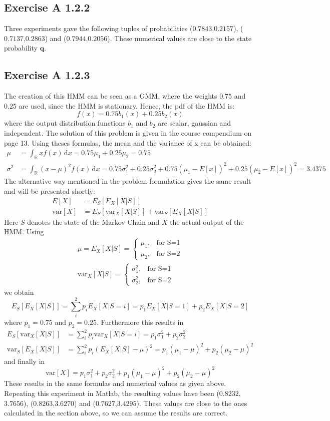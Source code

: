 \documentclass[10pt,a4paper,final]{article}
\begin{document}
\subsection{Exercise A 1.2.2}
Three experiments gave the following tuples of probabilities ($0.7843$,$0.2157$), ($0.7137$,$0.2863$) and ($0.7944$,$0.2056$). These numerical values are close to the state probability $\mathbf{q}$.
\subsection{Exercise A 1.2.3}
The creation of this HMM can be seen as a GMM, where the weights $0.75$ and $0.25$ are used, since the HMM is stationary. Hence, the pdf of the HMM is:
$$
f(x) = 0.75b_1(x) + 0.25b_2(x)$$
where the output distribution functions $b_1$ and $b_2$ are scalar, gaussian and independent. The solution of this problem is given in the course compendium on page 13. Using theses formulas, the mean and the variance of x can be obtained:
\begin{align*}
\mu  &= \int_{\mathbb{R}} \! xf(x) \, \mathrm{d}x= 0.75\mu_1 + 0.25\mu_2 = 0.75\\
\sigma^2  &=\int_{\mathbb{R}} \! (x-\mu)^2f(x) \, \mathrm{d}x=0.75\sigma_1^2+0.25\sigma_2^2+0.75(\mu_1-E[x])^2+0.25(\mu_2-E[x])^2 = 3.4375
\end{align*}
The alternative way mentioned in the problem formulation gives the same result and will be presented shortly:
\begin{align*}
E[X] &= E_S[E_X[X|S]]\\
\text{var}[X] &=E_S[\text{var}_X[X|S]]+\text{var}_S[E_X[X|S]]
\end{align*}
Here $S$ denotes the state of the Markov Chain and $X$ the actual output of the HMM. Using
\begin{align*}
\mu = E_X[X|S]= 
\begin{cases}
\mu_1, &\text{for S=1}\\
\mu_2, &\text{for S=2}
\end{cases}\\
\text{var}_X[X|S]=
\begin{cases}
\sigma_1^2, &\text{for S=1}\\
\sigma_2^2, &\text{for S=2}
\end{cases}
\end{align*}
we obtain
$$
E_S[E_X[X|S]] = \sum_i^2 p_i E_X[X|S=i] = p_1E_X[X|S=1]+p_2E_X[X|S=2]
$$
where $p_1 = 0.75$ and $p_2=0.25$. Furthermore this results in
\begin{align*}
E_S[\text{var}_X[X|S]] &= \sum_i^2 p_i \text{var}_X[X|S=i] = p_1\sigma_1^2+p_2\sigma_2^2\\
\text{var}_S[E_X[X|S]] &= \sum_i^2 p_i(E_X[X|S]-\mu)^2= p_1(\mu_1-\mu)^2+p_2(\mu_2-\mu)^2
\end{align*}
and finally in
$$
\text{var}[X] = p_1\sigma_1^2+p_2\sigma_2^2+p_1(\mu_1-\mu)^2+p_2(\mu_2-\mu)^2
$$
These results in the same formulas and numerical values as given above.\\
Repeating this experiment in Matlab, the resulting values have been ($0.8232$,$3.7656$), ($0.8263$,$3.6270$) and ($0.7627$,$3.4295$). These values are close to the ones calculated in the section above, so we can assume the results are correct.
\newpage
\end{document}
